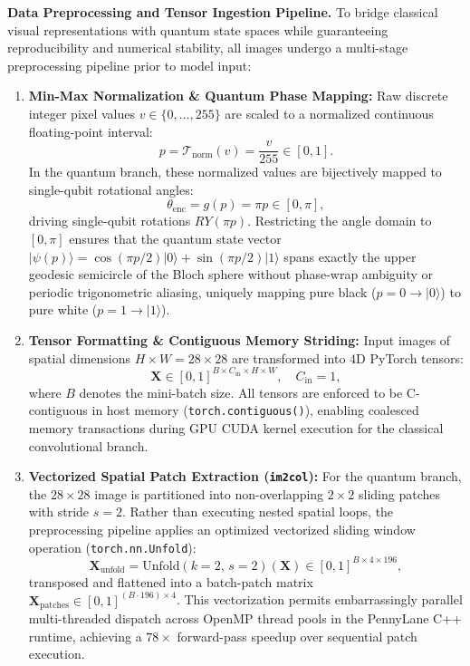 \documentclass[pdflatex,sn-mathphys-num]{sn-jnl}%
\theoremstyle{thmstyleone}%
\theoremstyle{thmstyletwo}%
\theoremstyle{thmstylethree}%
\begin{document}
\textbf{Data Preprocessing and Tensor Ingestion Pipeline.} To bridge classical visual representations with quantum state spaces while guaranteeing reproducibility and numerical stability, all images undergo a multi-stage preprocessing pipeline prior to model input:
\begin{enumerate}
    \item \textbf{Min-Max Normalization \& Quantum Phase Mapping:} Raw discrete integer pixel values $v \in \{0, \dots, 255\}$ are scaled to a normalized continuous floating-point interval:
    \begin{equation}
    p = \mathcal{T}_{\mathrm{norm}}(v) = \frac{v}{255} \in [0, 1].
    \label{eq:pixel_normalization}
    \end{equation}
    In the quantum branch, these normalized values are bijectively mapped to single-qubit rotational angles:
    \begin{equation}
    \theta_{\mathrm{enc}} = g(p) = \pi p \in [0, \pi],
    \label{eq:angle_mapping_pi}
    \end{equation}
    driving single-qubit rotations $RY(\pi p)$. Restricting the angle domain to $[0, \pi]$ ensures that the quantum state vector $|\psi(p)\rangle = \cos(\pi p / 2)|0\rangle + \sin(\pi p / 2)|1\rangle$ spans exactly the upper geodesic semicircle of the Bloch sphere without phase-wrap ambiguity or periodic trigonometric aliasing, uniquely mapping pure black ($p=0 \to |0\rangle$) to pure white ($p=1 \to |1\rangle$).
    
    \item \textbf{Tensor Formatting \& Contiguous Memory Striding:} Input images of spatial dimensions $H \times W = 28 \times 28$ are transformed into 4D PyTorch tensors:
    \begin{equation}
    \mathbf{X} \in [0, 1]^{B \times C_{\mathrm{in}} \times H \times W}, \quad C_{\mathrm{in}} = 1,
    \label{eq:tensor_shape}
    \end{equation}
    where $B$ denotes the mini-batch size. All tensors are enforced to be C-contiguous in host memory (\texttt{torch.contiguous()}), enabling coalesced memory transactions during GPU CUDA kernel execution for the classical convolutional branch.
    
    \item \textbf{Vectorized Spatial Patch Extraction (\texttt{im2col}):} For the quantum branch, the $28 \times 28$ image is partitioned into non-overlapping $2 \times 2$ sliding patches with stride $s=2$. Rather than executing nested spatial loops, the preprocessing pipeline applies an optimized vectorized sliding window operation (\texttt{torch.nn.Unfold}):
    \begin{equation}
    \mathbf{X}_{\mathrm{unfold}} = \mathrm{Unfold}(k=2, \, s=2)(\mathbf{X}) \in [0, 1]^{B \times 4 \times 196},
    \label{eq:unfold_vectorization}
    \end{equation}
    transposed and flattened into a batch-patch matrix $\mathbf{X}_{\mathrm{patches}} \in [0, 1]^{(B \cdot 196) \times 4}$. This vectorization permits embarrassingly parallel multi-threaded dispatch across OpenMP thread pools in the PennyLane C++ runtime, achieving a $78\times$ forward-pass speedup over sequential patch execution.
    

\end{enumerate}
\end{document}
